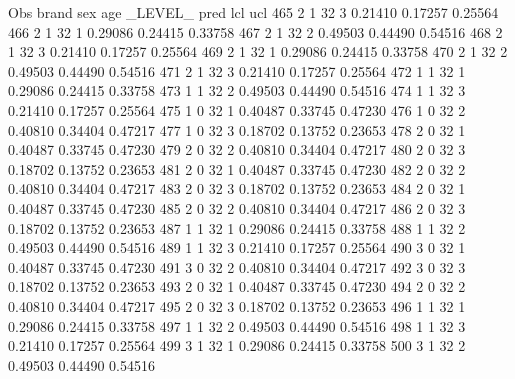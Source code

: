 \documentclass{article}
\begin{document}
\begin{Woutput}
 Obs    brand    sex    age    _LEVEL_      pred       lcl        ucl
 465      2       1      32       3       0.21410    0.17257    0.25564
 466      2       1      32       1       0.29086    0.24415    0.33758
 467      2       1      32       2       0.49503    0.44490    0.54516
 468      2       1      32       3       0.21410    0.17257    0.25564
 469      2       1      32       1       0.29086    0.24415    0.33758
 470      2       1      32       2       0.49503    0.44490    0.54516
 471      2       1      32       3       0.21410    0.17257    0.25564
 472      1       1      32       1       0.29086    0.24415    0.33758
 473      1       1      32       2       0.49503    0.44490    0.54516
 474      1       1      32       3       0.21410    0.17257    0.25564
 475      1       0      32       1       0.40487    0.33745    0.47230
 476      1       0      32       2       0.40810    0.34404    0.47217
 477      1       0      32       3       0.18702    0.13752    0.23653
 478      2       0      32       1       0.40487    0.33745    0.47230
 479      2       0      32       2       0.40810    0.34404    0.47217
 480      2       0      32       3       0.18702    0.13752    0.23653
 481      2       0      32       1       0.40487    0.33745    0.47230
 482      2       0      32       2       0.40810    0.34404    0.47217
 483      2       0      32       3       0.18702    0.13752    0.23653
 484      2       0      32       1       0.40487    0.33745    0.47230
 485      2       0      32       2       0.40810    0.34404    0.47217
 486      2       0      32       3       0.18702    0.13752    0.23653
 487      1       1      32       1       0.29086    0.24415    0.33758
 488      1       1      32       2       0.49503    0.44490    0.54516
 489      1       1      32       3       0.21410    0.17257    0.25564
 490      3       0      32       1       0.40487    0.33745    0.47230
 491      3       0      32       2       0.40810    0.34404    0.47217
 492      3       0      32       3       0.18702    0.13752    0.23653
 493      2       0      32       1       0.40487    0.33745    0.47230
 494      2       0      32       2       0.40810    0.34404    0.47217
 495      2       0      32       3       0.18702    0.13752    0.23653
 496      1       1      32       1       0.29086    0.24415    0.33758
 497      1       1      32       2       0.49503    0.44490    0.54516
 498      1       1      32       3       0.21410    0.17257    0.25564
 499      3       1      32       1       0.29086    0.24415    0.33758
 500      3       1      32       2       0.49503    0.44490    0.54516

\end{Woutput}
\end{document}
